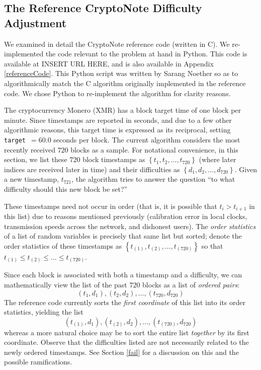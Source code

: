\documentclass[12pt,english]{mrl}
\theoremstyle{definition}
\renewcommand{\leq}{\leqslant}
\numberwithin{equation}{section}
\numberwithin{figure}{section}
\numberwithin{equation}{section}
\numberwithin{equation}{section}
\numberwithin{figure}{section}
\begin{document}
\subsection{The Reference CryptoNote Difficulty Adjustment}
We examined in detail the CryptoNote reference code (written in C). We re-implemented the code relevant to the problem at hand in Python. This code is available at INSERT URL HERE, and is also available in Appendix \ref{referenceCode}. This Python script was written by Sarang Noether so as to algorithmically match the C algorithm originally implemented in the reference code. We chose Python to re-implement the algorithm for clarity reasons.

The cryptocurrency Monero (XMR) has a block target time of one block per minute. Since timestamps are reported in seconds, and due to a few other algorithmic reasons, this target time is expressed as its reciprocal, setting \texttt{target~}$= 60.0$ seconds per block.  The current algorithm considers the most recently received $720$ blocks as a sample. For notational convenience, in this section, we list these $720$ block timestamps as $\left\{t_1, t_2, \ldots, t_{720}\right\}$ (where later indices are received later in time) and their difficulties as $\left\{d_1, d_2, \ldots, d_{720}\right\}$. Given a new timestamp, $t_{721}$, the algorithm tries to answer the question ``to what difficulty should this new block be set?''  

These timestamps need not occur in order (that is, it is possible that $t_{i} > t_{i+1}$ in this list) due to reasons mentioned previously (calibration error in local clocks, transmission speeds across the network, and dishonest users). The \textit{order statistics} of a list of random variables is precisely that same list but sorted; denote the order statistics of these timestamps as $\left\{t_{(1)}, t_{(2)}, \ldots, t_{(720)}\right\}$ so that $t_{(1)} \leq t_{(2)} \leq \ldots \leq t_{(720)}$.

Since each block is associated with both a timestamp and a difficulty, we can mathematically view the list of the past $720$ blocks as a list of \textit{ordered pairs}:
$$(t_1,d_1),(t_2,d_2),\ldots,(t_{720},d_{720})$$
The reference code currently sorts the \textit{first coordinate} of this list into its order statistics, yielding the list
$$(t_{(1)},d_1),(t_{(2)},d_2),\ldots,(t_{(720)},d_{720})$$
whereas a more natural choice may be to sort the entire list \textit{together} by its first coordinate. Observe that the difficulties listed are not necessarily related to the newly ordered timestamps. See Section \ref{fail} for a discussion on this and the possible ramifications.
\end{document}
